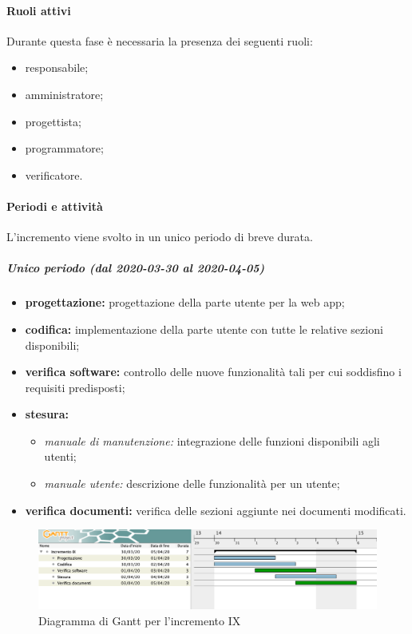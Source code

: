 			\paragraph{Ruoli attivi}
			
				Durante questa fase è necessaria la presenza dei seguenti ruoli:
				\begin{itemize}
					\item responsabile;
					\item amministratore;
					\item progettista;
					\item programmatore;
					\item verificatore.
				\end{itemize}
			
			\paragraph{Periodi e attività}
			
				L'incremento viene svolto in un unico periodo di breve durata.
				
				\subparagraph{Unico periodo (dal 2020-03-30 al 2020-04-05)}
				
					\begin{itemize}
						\item \textbf{progettazione:} progettazione della parte utente per la web app;
						\item \textbf{codifica:} implementazione della parte utente con tutte le relative sezioni disponibili;
						\item \textbf{verifica software:} controllo delle nuove funzionalità tali per cui soddisfino i requisiti predisposti;
						\item \textbf{stesura:} 
							\begin{itemize}
								\item \textit{manuale di manutenzione:} integrazione delle funzioni disponibili agli utenti;
								\item \textit{manuale utente:} descrizione delle funzionalità per un utente;
							\end{itemize}
						\item \textbf{verifica documenti:} verifica delle sezioni aggiunte nei documenti modificati.
					\end{itemize} 			

		\begin{landscape}
          \begin{figure}[H]
            \centering
            \includegraphics[width=\linewidth]{images/gantt/incrementoIX} %
            \caption{Diagramma di Gantt per l'incremento IX}
          \end{figure}		
		\end{landscape}

